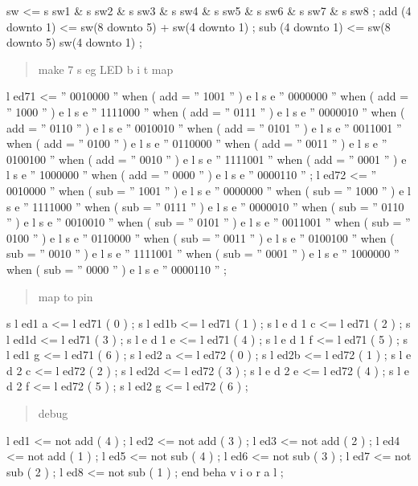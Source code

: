 \documentclass[letterpaper,10pt,dvipdfmx]{sphinxmanual}
\begin{document}
sw \textless{}= s sw1 \& s sw2 \& s sw3 \& s sw4 \& s sw5 \& s sw6 \& s sw7 \& s sw8 ;
add (4 downto 1) \textless{}= sw(8 downto 5) + sw(4 downto 1) ;
sub (4 downto 1) \textless{}= sw(8 downto 5)   sw(4 downto 1) ;
\begin{quote}

make 7 s eg LED b i t map
\end{quote}

l ed71 \textless{}= '' 0010000 '' when ( add = '' 1001 '' )
e l s e '' 0000000 '' when ( add = '' 1000 '' )
e l s e '' 1111000 '' when ( add = '' 0111 '' )
e l s e '' 0000010 '' when ( add = '' 0110 '' )
e l s e '' 0010010 '' when ( add = '' 0101 '' )
e l s e '' 0011001 '' when ( add = '' 0100 '' )
e l s e '' 0110000 '' when ( add = '' 0011 '' )
e l s e '' 0100100 '' when ( add = '' 0010 '' )
e l s e '' 1111001 '' when ( add = '' 0001 '' )
e l s e '' 1000000 '' when ( add = '' 0000 '' )
e l s e '' 0000110 '' ;
l ed72 \textless{}= '' 0010000 '' when ( sub = '' 1001 '' )
e l s e '' 0000000 '' when ( sub = '' 1000 '' )
e l s e '' 1111000 '' when ( sub = '' 0111 '' )
e l s e '' 0000010 '' when ( sub = '' 0110 '' )
e l s e '' 0010010 '' when ( sub = '' 0101 '' )
e l s e '' 0011001 '' when ( sub = '' 0100 '' )
e l s e '' 0110000 '' when ( sub = '' 0011 '' )
e l s e '' 0100100 '' when ( sub = '' 0010 '' )
e l s e '' 1111001 '' when ( sub = '' 0001 '' )
e l s e '' 1000000 '' when ( sub = '' 0000 '' )
e l s e '' 0000110 '' ;
\begin{quote}

map to pin
\end{quote}

s l ed1 a \textless{}= l ed71 ( 0 ) ;
s l ed1b \textless{}= l ed71 ( 1 ) ;
s l e d 1 c \textless{}= l ed71 ( 2 ) ;
s l ed1d \textless{}= l ed71 ( 3 ) ;
s l e d 1 e \textless{}= l ed71 ( 4 ) ;
s l e d 1 f \textless{}= l ed71 ( 5 ) ;
s l ed1 g \textless{}= l ed71 ( 6 ) ;
s l ed2 a \textless{}= l ed72 ( 0 ) ;
s l ed2b \textless{}= l ed72 ( 1 ) ;
s l e d 2 c \textless{}= l ed72 ( 2 ) ;
s l ed2d \textless{}= l ed72 ( 3 ) ;
s l e d 2 e \textless{}= l ed72 ( 4 ) ;
s l e d 2 f \textless{}= l ed72 ( 5 ) ;
s l ed2 g \textless{}= l ed72 ( 6 ) ;
\begin{quote}

debug
\end{quote}

l ed1 \textless{}= not add ( 4 ) ;
l ed2 \textless{}= not add ( 3 ) ;
l ed3 \textless{}= not add ( 2 ) ;
l ed4 \textless{}= not add ( 1 ) ;
l ed5 \textless{}= not sub ( 4 ) ;
l ed6 \textless{}= not sub ( 3 ) ;
l ed7 \textless{}= not sub ( 2 ) ;
l ed8 \textless{}= not sub ( 1 ) ;
end beha v i o r a l ;
\end{document}

